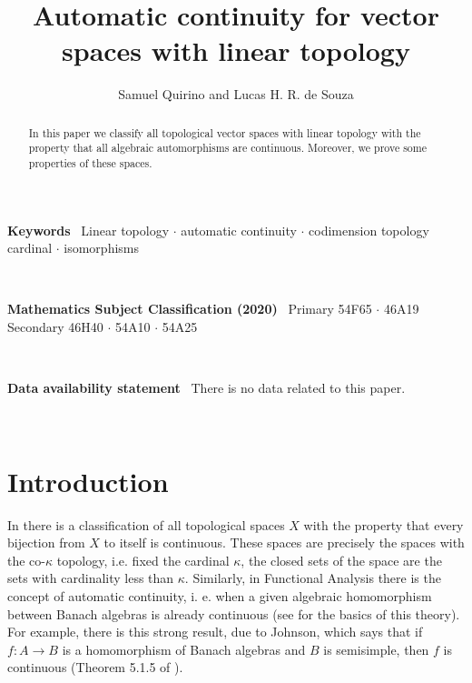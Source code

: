 \documentclass[a4paper,12pt]{article}
\title{Automatic continuity for vector spaces with linear topology}
\author{Samuel Quirino and Lucas H. R. de Souza}
\theoremstyle{bloco}
\begin{document}

\maketitle

\begin{abstract}In this paper we classify all topological vector spaces with linear topology with the property that all algebraic automorphisms are continuous. Moreover, we prove some properties of these spaces.
\end{abstract}

\textbf{Keywords} \ Linear topology $\cdot$ automatic continuity $\cdot$ codimension topology  cardinal $\cdot$ isomorphisms

\

\textbf{Mathematics Subject Classification (2020)} \ Primary 54F65 $\cdot$ 46A19  Secondary 46H40 $\cdot$ 54A10 $\cdot$ 54A25


\

\textbf{Data availability statement} \ There is no data related to this paper.

\


\section*{Introduction}

In \cite{So9} there is a classification of all topological spaces $X$ with the property that every bijection from $X$ to itself is continuous. These spaces are precisely the spaces with the co-$\kappa$ topology, i.e. fixed the cardinal $\kappa$, the closed sets of the space are the sets with cardinality less than $\kappa$. Similarly, in Functional Analysis there is the concept of automatic continuity, i. e. when a given algebraic homomorphism between  Banach algebras is already continuous (see \cite{Dal} for the basics of this theory). For example, there is this strong result, due to Johnson, which says that if $f: A \rightarrow B$ is a homomorphism of Banach algebras and $B$ is semisimple, then $f$ is continuous (Theorem 5.1.5 of \cite{Dal}).
\end{document}
